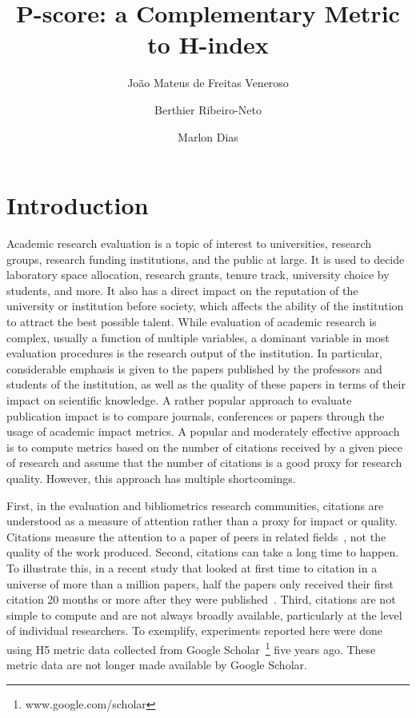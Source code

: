 \documentclass[man]{apa6}
\title{P-score: a Complementary Metric to H-index}
\author{João Mateus de Freitas Veneroso}
\author{Berthier Ribeiro-Neto}
\author{Marlon Dias}
\affil{Department of Computer Science, Universidade Federal de Minas Gerais, Av. Pres. Antônio Carlos, 6627 - Pampulha, Belo Horizonte - MG, 31270-901, Brazil. Emails: joao.veneroso@dcc.ufmg.br, berthier@dcc.ufmg.br, msdias@dcc.ufmg.br}
\begin{document}
\setlength{\parindent}{40pt}

\maketitle

\section{Introduction}
\label{sec:introduction}

Academic research evaluation is a topic of interest to universities, research groups,
research funding institutions, and the public at large. It is used to decide laboratory space
allocation, research grants, tenure track, university choice by students, and more. It also 
has a direct impact on the reputation of the university or institution before society, which
affects the ability of the institution to attract the best possible talent. While evaluation of
academic research is complex, usually a function of multiple variables, a dominant variable in
most evaluation procedures is the research output of the institution. In particular, considerable
emphasis is given to the papers published by the professors and students of the institution, as
well as the quality of these papers in terms of their impact on scientific knowledge. A rather
popular approach to evaluate publication impact is to compare journals, conferences or papers
through the usage of academic impact metrics. A popular and moderately effective approach is to
compute metrics based on the number of citations received by a given piece of research and
assume that the number of citations is a good proxy for research quality. However,
this approach has multiple shortcomings. 

First, in the evaluation and bibliometrics research communities, citations are understood
as a measure of attention rather than a proxy for impact or quality. Citations measure 
the attention to a paper of peers in related fields~\cite{Loach2015}, not the quality of the 
work produced. Second, citations can take a long time to happen. To illustrate this, in a recent
study that looked at first time to citation in a universe of more than a million papers, half the 
papers only received their first citation 20 months or more after they were
published~\cite{Nane2012}. Third, citations are not simple to compute and are not always broadly
available, particularly at the level of individual researchers. To exemplify,
experiments reported here were done using H5 metric data collected from Google 
Scholar~\footnote{www.google.com/scholar} five years ago. These metric data are not longer 
made available by Google Scholar.
\end{document}
